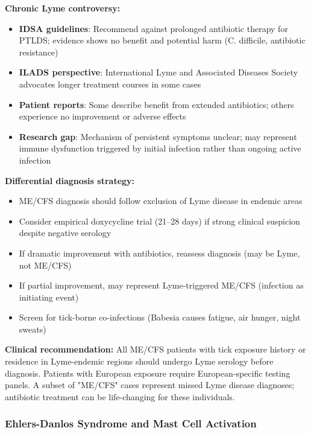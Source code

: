 \begin{observation}
\textbf{Chronic Lyme controversy:}
\begin{itemize}
    \item \textbf{IDSA guidelines}: Recommend against prolonged antibiotic therapy for PTLDS; evidence shows no benefit and potential harm (C. difficile, antibiotic resistance)
    \item \textbf{ILADS perspective}: International Lyme and Associated Diseases Society advocates longer treatment courses in some cases
    \item \textbf{Patient reports}: Some describe benefit from extended antibiotics; others experience no improvement or adverse effects
    \item \textbf{Research gap}: Mechanism of persistent symptoms unclear; may represent immune dysfunction triggered by initial infection rather than ongoing active infection
\end{itemize}

\textbf{Differential diagnosis strategy:}
\begin{itemize}
    \item ME/CFS diagnosis should follow exclusion of Lyme disease in endemic areas
    \item Consider empirical doxycycline trial (21--28 days) if strong clinical suspicion despite negative serology
    \item If dramatic improvement with antibiotics, reassess diagnosis (may be Lyme, not ME/CFS)
    \item If partial improvement, may represent Lyme-triggered ME/CFS (infection as initiating event)
    \item Screen for tick-borne co-infections (Babesia causes fatigue, air hunger, night sweats)
\end{itemize}

\textbf{Clinical recommendation:} All ME/CFS patients with tick exposure history or residence in Lyme-endemic regions should undergo Lyme serology before diagnosis. Patients with European exposure require European-specific testing panels. A subset of "ME/CFS" cases represent missed Lyme disease diagnoses; antibiotic treatment can be life-changing for these individuals.
\end{observation}

\subsubsection{Ehlers-Danlos Syndrome and Mast Cell Activation}

